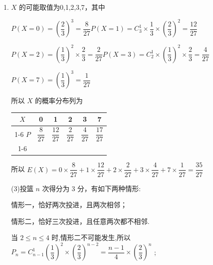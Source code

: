 \begin{enumerate}
\begin{enumerate}
\begin{jieda}
\begin{enumerate}
                所以 $E\left( X\right)  > {10}$ .
                
                \item $X$ 的可能取值为0,1,2,3,7，其中
                
                $P\left( {X = 0}\right)  = {\left( \dfrac{2}{3}\right) }^{3} = \dfrac{8}{27}P\left( {X = 1}\right)  = {{C}}_{3}^{1} \times  \dfrac{1}{3} \times  {\left( \dfrac{2}{3}\right) }^{2} = \dfrac{12}{27}$
                
                $P\left( {X = 2}\right)  = {\left( \dfrac{1}{3}\right) }^{2} \times  \dfrac{2}{3} = \dfrac{2}{27}P\left( {X = 3}\right)  = {{C}}_{2}^{1} \times  {\left( \dfrac{1}{3}\right) }^{2} \times  \dfrac{2}{3} = \dfrac{4}{27}$
                
                $P\left( {X = 7}\right)  = {\left( \dfrac{1}{3}\right) }^{3} = \dfrac{1}{27}$
                
                所以 $X$ 的概率分布列为
                
                \begin{center}
                \begin{tabular}{|c|c|c|c|c|c|}
                \hline
                $X$ & 0 & 1 & 2 & 3 & 7 \\
                \cline{1-6}
                $P$ & $\dfrac{8}{27}$ & $\dfrac{12}{27}$ & $\dfrac{2}{27}$ & $\dfrac{4}{27}$ & $\dfrac{17}{27}$ \\
                \cline{1-6}
                \hline
                \end{tabular}
                
                \end{center}
                
                所以 $E\left( X\right)  = 0 \times  \dfrac{8}{27} + 1 \times  \dfrac{12}{27} + 2 \times  \dfrac{2}{27} + 3 \times  \dfrac{4}{27} + 7 \times  \dfrac{1}{27} = \dfrac{35}{27}$
                
                (3)投篮 $n$ 次得分为 3 分，有如下两种情形:
                
                情形一，恰好两次投进，且两次相邻；
                
                情形二，恰好三次投进，且任意两次都不相邻.
                
                当 $2 \leq  n \leq  4$ 时,情形二不可能发生,所以 ${P}_{n} = {{C}}_{n - 1}^{1}{\left( \dfrac{1}{3}\right) }^{2} \times  {\left( \dfrac{2}{3}\right) }^{n - 2} = \dfrac{n - 1}{4} \times  {\left( \dfrac{2}{3}\right) }^{n}$ ;
                

\end{enumerate}
\end{jieda}
\end{enumerate}
\end{enumerate}
